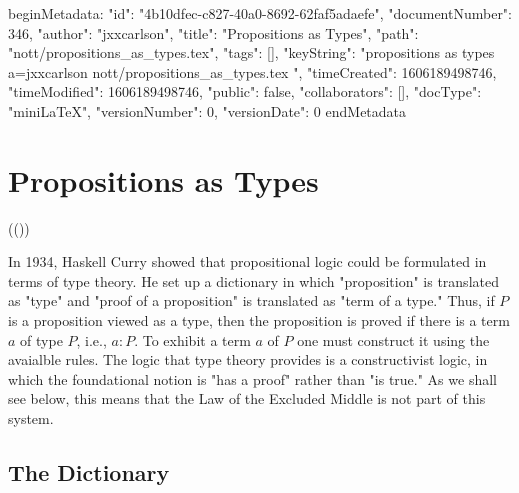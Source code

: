 beginMetadata:
{
    "id": "4b10dfec-c827-40a0-8692-62faf5adaefe",
    "documentNumber": 346,
    "author": "jxxcarlson",
    "title": "Propositions as Types",
    "path": "nott/propositions_as_types.tex",
    "tags": [],
    "keyString": "propositions as types a=jxxcarlson nott/propositions_as_types.tex ",
    "timeCreated": 1606189498746,
    "timeModified": 1606189498746,
    "public": false,
    "collaborators": [],
    "docType": "miniLaTeX",
    "versionNumber": 0,
    "versionDate": 0
}
endMetadata


\setcounter{section}{2}

\section{Propositions as Types}

(())

\innertableofcontents


In 1934, Haskell Curry showed that propositional logic could be formulated in terms of type theory.  He set up a dictionary in which "proposition" is translated as "type" and "proof of a proposition" is translated as "term of a type."  Thus, if $P$ is a proposition viewed as a type, then the proposition is proved if there is a term $a $ of type $P$, i.e.,  $a : P$.  To exhibit a term $a$ of $P$ one must construct it using the avaialble rules.  The logic that type theory provides is a constructivist logic, in which the foundational notion is "has a proof" rather than "is true."  As we shall see below, this means that the Law of the Excluded Middle is not part of this system.

\subsection{The Dictionary}


